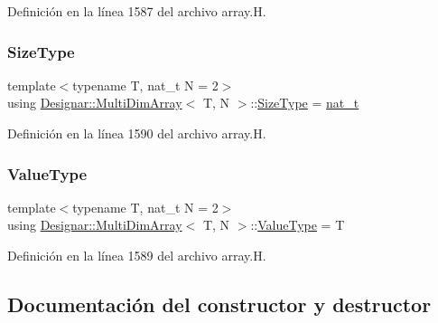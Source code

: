 Definición en la línea 1587 del archivo array.\+H.

\mbox{\label{class_designar_1_1_multi_dim_array_a45c10514739f65d38ae3749569739267}} 
\subsubsection{\texorpdfstring{Size\+Type}{SizeType}}
{\footnotesize\ttfamily template$<$typename T, nat\+\_\+t N = 2$>$ \\
using \hyperlink{class_designar_1_1_multi_dim_array}{Designar\+::\+Multi\+Dim\+Array}$<$ T, N $>$\+::\hyperlink{class_designar_1_1_multi_dim_array_a45c10514739f65d38ae3749569739267}{Size\+Type} =  \hyperlink{namespace_designar_aa72662848b9f4815e7bf31a7cf3e33d1}{nat\+\_\+t}}



Definición en la línea 1590 del archivo array.\+H.

\mbox{\label{class_designar_1_1_multi_dim_array_aecea28d754897523cdfa68bc28b829d3}} 
\subsubsection{\texorpdfstring{Value\+Type}{ValueType}}
{\footnotesize\ttfamily template$<$typename T, nat\+\_\+t N = 2$>$ \\
using \hyperlink{class_designar_1_1_multi_dim_array}{Designar\+::\+Multi\+Dim\+Array}$<$ T, N $>$\+::\hyperlink{class_designar_1_1_multi_dim_array_aecea28d754897523cdfa68bc28b829d3}{Value\+Type} =  T}



Definición en la línea 1589 del archivo array.\+H.



\subsection{Documentación del constructor y destructor}
\mbox{\label{class_designar_1_1_multi_dim_array_a52a96f1eeb1176cc18d6329ab75e59f8}} 
